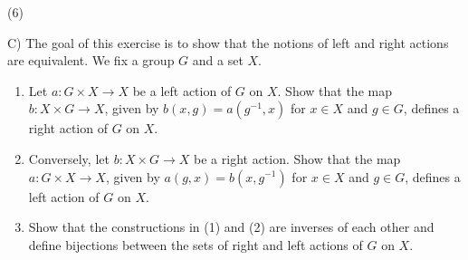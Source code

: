 \documentclass[12pt,a4paper]{article}
\begin{document}
\newpage
\noindent
(6)
 
\newpage
\noindent
C) The goal of this exercise is to show that the notions of left and right actions are equivalent. We fix a group $G$ and a set $X$.
\begin{enumerate}
\renewcommand{\labelenumi}{(\arabic{enumi})}
\item Let $a:G\times X\to X$ be a left action of $G$ on $X$. Show that the map $b:X\times G\to X$, given by $b(x,g)=a(g^{-1},x)$ for $x\in X$ and $g\in G$, defines a right action of $G$ on $X$.
\item Conversely, let $b:X\times G\to X$ be a right action. Show that the map $a:G\times X\to X$, given by $a(g,x)=b(x,g^{-1})$ for $x\in X$ and $g\in G$, defines a left action of $G$ on $X$.
\item Show that the constructions in (1) and (2) are inverses of each other and define bijections between the sets of right and left actions of $G$ on $X$.
\end{enumerate}
\end{document}
